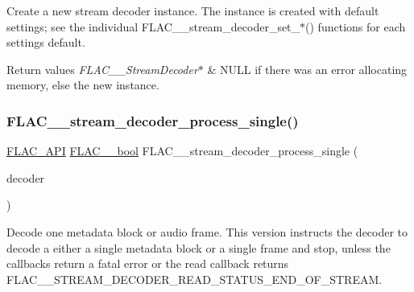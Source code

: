 Create a new stream decoder instance. The instance is created with default settings; see the individual F\+L\+A\+C\+\_\+\+\_\+stream\+\_\+decoder\+\_\+set\+\_\+$\ast$() functions for each setting\textquotesingle{}s default.


\begin{DoxyRetVals}{Return values}
{\em F\+L\+A\+C\+\_\+\+\_\+\+Stream\+Decoder$\ast$} & {\ttfamily N\+U\+LL} if there was an error allocating memory, else the new instance. \\
\hline
\end{DoxyRetVals}
\mbox{\label{group__flac__stream__decoder_ga8c4708eb2c5d99595f64dc2473aa2f42}} 
\subsubsection{\texorpdfstring{F\+L\+A\+C\+\_\+\+\_\+stream\+\_\+decoder\+\_\+process\+\_\+single()}{FLAC\_\_stream\_decoder\_process\_single()}}
{\footnotesize\ttfamily \hyperlink{group__flac__export_ga56ca07df8a23310707732b1c0007d6f5}{F\+L\+A\+C\+\_\+\+A\+PI} \hyperlink{ordinals_8h_a95103469f1cbd78b8cf250194985b34e}{F\+L\+A\+C\+\_\+\+\_\+bool} F\+L\+A\+C\+\_\+\+\_\+stream\+\_\+decoder\+\_\+process\+\_\+single (\begin{DoxyParamCaption}\item[{\hyperlink{struct_f_l_a_c_____stream_decoder}{F\+L\+A\+C\+\_\+\+\_\+\+Stream\+Decoder} $\ast$}]{decoder }\end{DoxyParamCaption})}

Decode one metadata block or audio frame. This version instructs the decoder to decode a either a single metadata block or a single frame and stop, unless the callbacks return a fatal error or the read callback returns {\ttfamily F\+L\+A\+C\+\_\+\+\_\+\+S\+T\+R\+E\+A\+M\+\_\+\+D\+E\+C\+O\+D\+E\+R\+\_\+\+R\+E\+A\+D\+\_\+\+S\+T\+A\+T\+U\+S\+\_\+\+E\+N\+D\+\_\+\+O\+F\+\_\+\+S\+T\+R\+E\+AM}.

